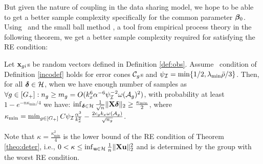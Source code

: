 But given the nature of coupling in the data sharing model, we hope to be able to get a better sample complexity specifically for the common parameter $\boldsymbol{\beta}_0$.
Using \ds\ and the small ball method \cite{mend15}, a tool from empirical process theory in the following theorem, we get a better sample complexity required for satisfying the RE condition:
\begin{theorem}
	\label{theo:re}
	Let $\mathbf{x}_{gi}$s	be random vectors defined in Definition \ref{def:obs}.
	Assume \ds\ condition of Definition \ref{incodef} holds for error cones $\cC_g$s and $\rinc=\min\{1/2, \lamin\ratio/3\}$.
	Then, for all $\ddelta \in \cH$, when we have enough number of samples as $\forall g \in [G_+]: n_g \geq m_g = O(k_x^6 \alpha^{-6} \rinc^{-2} \omega(\cA_g)^2)$, with probability at least $1 - e^{-n \kappa_{\min}/4}$  we have:
	$\inf_{\ddelta \in \cH} \frac{1}{\sqrt{n}} \norm{\X \ddelta}{2} \geq \frac{\kappa_{\min}}{2}$,
	where $\kappa_{\min} = \min_{g\in [G_+]} C \rinc \frac{\alpha^3}{k_x^2}  - \frac{2 c_g k_x \omega(\cA_g)}{\sqrt{n_g}}$. 
\end{theorem}

\begin{remark}
	Note that $\kappa = \frac{\kappa_{\min}^2}{4}$ is the lower bound of the RE condition of Theorem \ref{theo:deter}, i.e., $0 < \kappa \leq \inf_{\u \in \cH} \frac{1}{n} \norm{\X \u}{2}^2$ and is determined by the group with the worst RE condition. 
\end{remark}

